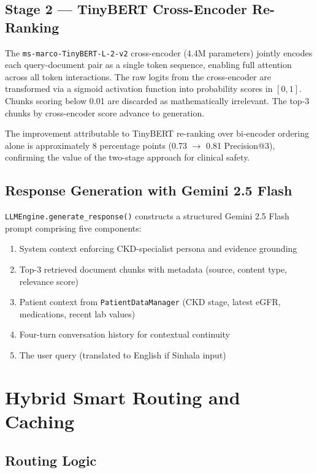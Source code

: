 \documentclass[12pt,a4paper]{report}
\begin{document}
\subsection{Stage 2 — TinyBERT Cross-Encoder Re-Ranking}

The \texttt{ms-marco-TinyBERT-L-2-v2} cross-encoder (4.4M parameters) jointly encodes each query-document pair as a single token sequence, enabling full attention across all token interactions. The raw logits from the cross-encoder are transformed via a sigmoid activation function into probability scores in $[0, 1]$. Chunks scoring below 0.01 are discarded as mathematically irrelevant. The top-3 chunks by cross-encoder score advance to generation.

The improvement attributable to TinyBERT re-ranking over bi-encoder ordering alone is approximately 8 percentage points (0.73 $\to$ 0.81 Precision@3), confirming the value of the two-stage approach for clinical safety.

\subsection{Response Generation with Gemini 2.5 Flash}

\texttt{LLMEngine.generate\_response()} constructs a structured Gemini 2.5 Flash prompt comprising five components:
\begin{enumerate}
  \item System context enforcing CKD-specialist persona and evidence grounding
  \item Top-3 retrieved document chunks with metadata (source, content type, relevance score)
  \item Patient context from \texttt{PatientDataManager} (CKD stage, latest eGFR, medications, recent lab values)
  \item Four-turn conversation history for contextual continuity
  \item The user query (translated to English if Sinhala input)
\end{enumerate}

\section{Hybrid Smart Routing and Caching}

\subsection{Routing Logic}
\end{document}
